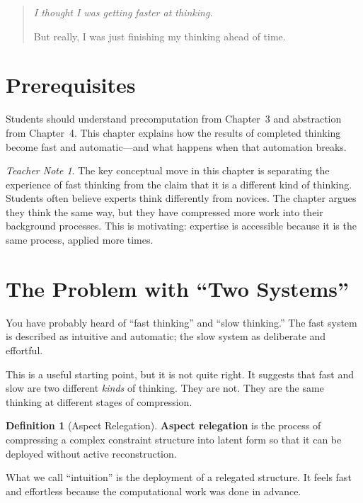 \documentclass[11pt]{book}
\theoremstyle{definition}
\newtheorem{definition}{Definition}[chapter]
\theoremstyle{remark}
\newtheorem{teachernote}{Teacher Note}[chapter]
\newenvironment{deepthought}
  {\begin{quote}\itshape}
  {\end{quote}}
\begin{document}
\begin{deepthought}
I thought I was getting faster at thinking.

But really, I was just finishing my thinking ahead of time.
\end{deepthought}

\section*{Prerequisites}

Students should understand precomputation from Chapter~3 and abstraction
from Chapter~4. This chapter explains how the results of completed
thinking become fast and automatic---and what happens when that
automation breaks.

\begin{teachernote}
The key conceptual move in this chapter is separating the experience of
fast thinking from the claim that it is a different kind of thinking.
Students often believe experts think differently from novices. The
chapter argues they think the same way, but they have compressed more
work into their background processes. This is motivating: expertise
is accessible because it is the same process, applied more times.
\end{teachernote}

\section{The Problem with ``Two Systems''}

You have probably heard of ``fast thinking'' and ``slow thinking.'' The
fast system is described as intuitive and automatic; the slow system as
deliberate and effortful.

This is a useful starting point, but it is not quite right. It suggests
that fast and slow are two different \emph{kinds} of thinking. They are
not. They are the same thinking at different stages of compression.

\begin{definition}[Aspect Relegation]
\textbf{Aspect relegation} is the process of compressing a complex
constraint structure into latent form so that it can be deployed
without active reconstruction.
\end{definition}

What we call ``intuition'' is the deployment of a relegated structure.
It feels fast and effortless because the computational work was done in
advance.
\end{document}
